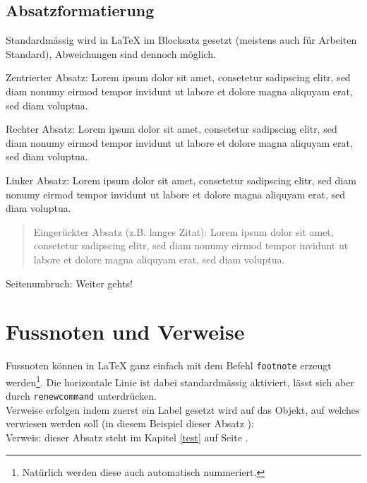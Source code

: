 \documentclass[paper=a4    %
,twoside=false             %
,fontsize=12pt             %
,DIV=11                    %
,parskip=half		   %
]{scrartcl}
\begin{document}
\subsection{Absatzformatierung}
Standardm\"assig wird in \LaTeX{} im Blocksatz gesetzt (meistens auch f\"ur Arbeiten Standard), Abweichungen sind dennoch m\"oglich.
\begin{center}
Zentrierter Absatz: Lorem ipsum dolor sit amet, consetetur sadipscing elitr, sed diam nonumy eirmod tempor invidunt ut labore et dolore magna aliquyam erat, sed diam voluptua.
\end{center}
\begin{flushright}
Rechter Absatz: Lorem ipsum dolor sit amet, consetetur sadipscing elitr, sed diam nonumy eirmod tempor invidunt ut labore et dolore magna aliquyam erat, sed diam voluptua.
\end{flushright}
\begin{flushleft}
Linker Absatz: Lorem ipsum dolor sit amet, consetetur sadipscing elitr, sed diam nonumy eirmod tempor invidunt ut labore et dolore magna aliquyam erat, sed diam voluptua.
\end{flushleft}
\begin{quote}
Einger\"uckter Absatz (z.B. langes Zitat): Lorem ipsum dolor sit amet, consetetur sadipscing elitr, sed diam nonumy eirmod tempor invidunt ut labore et dolore magna aliquyam erat, sed diam voluptua.
\end{quote}
Seitenumbruch: \newpage
Weiter gehts!
\section{Fussnoten und Verweise}
Fussnoten k\"onnen in \LaTeX{} ganz einfach mit dem Befehl \texttt{footnote} erzeugt werden\footnote{Nat\"urlich werden diese auch automatisch nummeriert.}. Die horizontale Linie ist dabei standardm\"assig aktiviert, l\"asst sich aber durch \texttt{renewcommand} unterdr\"ucken.\\
Verweise erfolgen indem zuerst ein Label gesetzt wird auf das Objekt, auf welches verwiesen werden soll (in diesem Beispiel dieser Absatz \label{test}): \\
Verweis: dieser Absatz steht im Kapitel \ref{test} auf Seite \pageref{test}.\\
\end{document}
